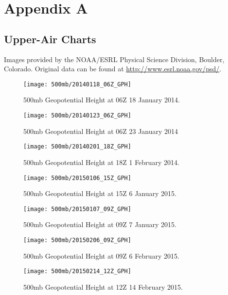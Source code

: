 \chapter{Appendix A}
\section{Upper-Air Charts}
Images provided by the NOAA/ESRL Physical Science Division, Boulder, Colorado. Original data can be found at \url{http://www.esrl.noaa.gov/psd/}.
\begin{figure}
\texttt{[image: 500mb/20140118\_06Z\_GPH]}
\caption{500mb Geopotential Height at 06Z 18 January 2014.} 
\label{fig:gph_20140118}
\end{figure}


\begin{figure}
\texttt{[image: 500mb/20140123\_06Z\_GPH]}
\caption{500mb Geopotential Height at 06Z 23 January 2014} 
\label{fig:gph_20140123}
\end{figure}

\begin{figure}
\texttt{[image: 500mb/20140201\_18Z\_GPH]}
\caption{500mb Geopotential Height at 18Z 1 February 2014.}
\label{fig:gph_20140106}
\end{figure}

\begin{figure}
\texttt{[image: 500mb/20150106\_15Z\_GPH]}
\caption{500mb Geopotential Height at 15Z 6 January 2015.} 
\label{fig:gph_20150106}
\end{figure}


\begin{figure}
\texttt{[image: 500mb/20150107\_09Z\_GPH]}
\caption{500mb Geopotential Height at 09Z 7 January 2015.} 
\label{fig:gph_20150107}
\end{figure}


\begin{figure}
\texttt{[image: 500mb/20150206\_09Z\_GPH]}
\caption{500mb Geopotential Height at 09Z 6 February 2015.} 
\label{fig:gph_20150206}
\end{figure}


\begin{figure}
\texttt{[image: 500mb/20150214\_12Z\_GPH]}
\caption{500mb Geopotential Height at 12Z 14 February 2015.} 
\label{fig:gph_20150214}
\end{figure}


